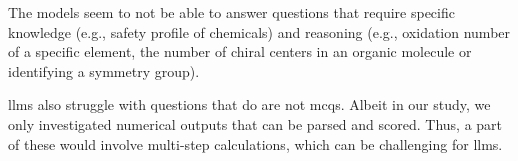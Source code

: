 The models seem to not be able to answer questions that require specific knowledge (e.g., safety profile of chemicals) and reasoning (e.g., oxidation number of a specific element, the number of chiral centers in an organic molecule or identifying a symmetry group).

\glspl{llm} also struggle with questions that do are not \glspl{mcq}.
Albeit in our study, we only investigated numerical outputs that can be parsed and scored. Thus, a part of these would involve multi-step calculations, which can be challenging for \glspl{llm}.\autocite{zhou2023llm_arithmetics}